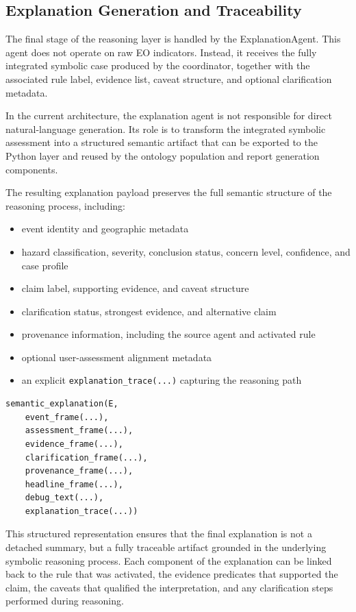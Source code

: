 \documentclass[12pt]{article}
\let\oldtexttt\texttt
\renewcommand{\texttt}[1]{{\fontsize{10.5}{12}\selectfont\oldtexttt{#1}}}
\begin{document}
\subsection{Explanation Generation and Traceability}

The final stage of the reasoning layer is handled by the ExplanationAgent. This agent does not operate on raw EO indicators. Instead, it receives the fully integrated symbolic case produced by the coordinator, together with the associated rule label, evidence list, caveat structure, and optional clarification metadata.

In the current architecture, the explanation agent is not responsible for direct natural-language generation. Its role is to transform the integrated symbolic assessment into a structured semantic artifact that can be exported to the Python layer and reused by the ontology population and report generation components.

The resulting explanation payload preserves the full semantic structure of the reasoning process, including:

\begin{itemize}
\item event identity and geographic metadata
\item hazard classification, severity, conclusion status, concern level, confidence, and case profile
\item claim label, supporting evidence, and caveat structure
\item clarification status, strongest evidence, and alternative claim
\item provenance information, including the source agent and activated rule
\item optional user-assessment alignment metadata
\item an explicit \texttt{explanation\_trace(...)} capturing the reasoning path
\end{itemize}

\begin{lstlisting}
semantic_explanation(E,
    event_frame(...),
    assessment_frame(...),
    evidence_frame(...),
    clarification_frame(...),
    provenance_frame(...),
    headline_frame(...),
    debug_text(...),
    explanation_trace(...))
\end{lstlisting}

This structured representation ensures that the final explanation is not a detached summary, but a fully traceable artifact grounded in the underlying symbolic reasoning process. Each component of the explanation can be linked back to the rule that was activated, the evidence predicates that supported the claim, the caveats that qualified the interpretation, and any clarification steps performed during reasoning.
\end{document}
